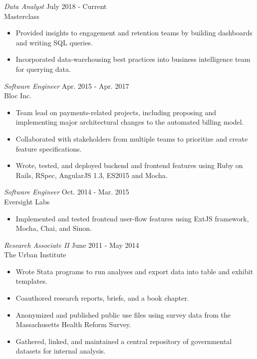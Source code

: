 \documentclass[margin, 10pt]{res} %
\begin{document}
\begin{resume}
{\sl Data Analyst} \hfill July 2018 - Current \\
Masterclass
\begin{itemize} \itemsep -2pt %
\item Provided insights to engagement and retention teams by building dashboards and writing SQL queries.
\item Incorporated data-warehousing best practices into business intelligence team for querying data.
\end{itemize}

{\sl Software Engineer} \hfill Apr. 2015 - Apr. 2017 \\
Bloc Inc.
\begin{itemize} \itemsep -2pt %
\item Team lead on payments-related projects, including proposing and implementing major architectural changes to the automated billing model.
\item Collaborated with stakeholders from multiple teams to prioritize and create feature specifications.
\item Wrote, tested, and deployed backend and frontend features using Ruby on Rails, RSpec, AngularJS 1.3, ES2015 and Mocha.
\end{itemize}

{\sl Software Engineer} \hfill Oct. 2014 - Mar. 2015 \\
Eversight Labs
\begin{itemize} \itemsep -2pt %
\item Implemented and tested frontend user-flow features using ExtJS framework, Mocha, Chai, and Sinon.
\end{itemize}

{\sl  Research Associate II } \hfill June 2011 - May 2014\\
The Urban Institute
\begin{itemize} \itemsep -2pt %
\item Wrote Stata programs to run analyses and export data into table and exhibit templates.
\item Coauthored research reports, briefs, and a book chapter.
\item Anonymized and published public use files using survey data from the Massachusetts Health Reform Survey.
\item Gathered, linked, and maintained a central repository of governmental datasets for internal analysis.
\end{itemize}


\end{resume}
\end{document}
